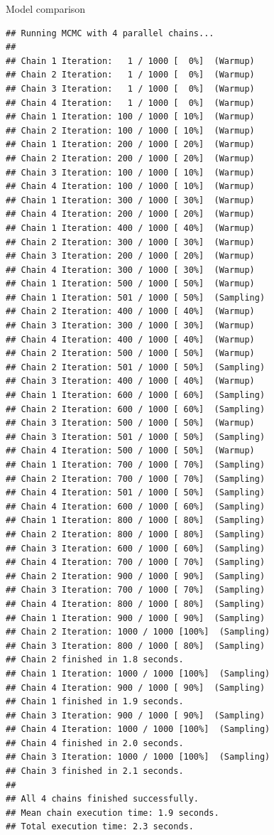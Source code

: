 \documentclass[
  ignorenonframetext,
]{beamer}
\begin{document}
\begin{frame}[fragile]{Model comparison}
\begin{verbatim}
## Running MCMC with 4 parallel chains...
## 
## Chain 1 Iteration:   1 / 1000 [  0%]  (Warmup) 
## Chain 2 Iteration:   1 / 1000 [  0%]  (Warmup) 
## Chain 3 Iteration:   1 / 1000 [  0%]  (Warmup) 
## Chain 4 Iteration:   1 / 1000 [  0%]  (Warmup) 
## Chain 1 Iteration: 100 / 1000 [ 10%]  (Warmup) 
## Chain 2 Iteration: 100 / 1000 [ 10%]  (Warmup) 
## Chain 1 Iteration: 200 / 1000 [ 20%]  (Warmup) 
## Chain 2 Iteration: 200 / 1000 [ 20%]  (Warmup) 
## Chain 3 Iteration: 100 / 1000 [ 10%]  (Warmup) 
## Chain 4 Iteration: 100 / 1000 [ 10%]  (Warmup) 
## Chain 1 Iteration: 300 / 1000 [ 30%]  (Warmup) 
## Chain 4 Iteration: 200 / 1000 [ 20%]  (Warmup) 
## Chain 1 Iteration: 400 / 1000 [ 40%]  (Warmup) 
## Chain 2 Iteration: 300 / 1000 [ 30%]  (Warmup) 
## Chain 3 Iteration: 200 / 1000 [ 20%]  (Warmup) 
## Chain 4 Iteration: 300 / 1000 [ 30%]  (Warmup) 
## Chain 1 Iteration: 500 / 1000 [ 50%]  (Warmup) 
## Chain 1 Iteration: 501 / 1000 [ 50%]  (Sampling) 
## Chain 2 Iteration: 400 / 1000 [ 40%]  (Warmup) 
## Chain 3 Iteration: 300 / 1000 [ 30%]  (Warmup) 
## Chain 4 Iteration: 400 / 1000 [ 40%]  (Warmup) 
## Chain 2 Iteration: 500 / 1000 [ 50%]  (Warmup) 
## Chain 2 Iteration: 501 / 1000 [ 50%]  (Sampling) 
## Chain 3 Iteration: 400 / 1000 [ 40%]  (Warmup) 
## Chain 1 Iteration: 600 / 1000 [ 60%]  (Sampling) 
## Chain 2 Iteration: 600 / 1000 [ 60%]  (Sampling) 
## Chain 3 Iteration: 500 / 1000 [ 50%]  (Warmup) 
## Chain 3 Iteration: 501 / 1000 [ 50%]  (Sampling) 
## Chain 4 Iteration: 500 / 1000 [ 50%]  (Warmup) 
## Chain 1 Iteration: 700 / 1000 [ 70%]  (Sampling) 
## Chain 2 Iteration: 700 / 1000 [ 70%]  (Sampling) 
## Chain 4 Iteration: 501 / 1000 [ 50%]  (Sampling) 
## Chain 4 Iteration: 600 / 1000 [ 60%]  (Sampling) 
## Chain 1 Iteration: 800 / 1000 [ 80%]  (Sampling) 
## Chain 2 Iteration: 800 / 1000 [ 80%]  (Sampling) 
## Chain 3 Iteration: 600 / 1000 [ 60%]  (Sampling) 
## Chain 4 Iteration: 700 / 1000 [ 70%]  (Sampling) 
## Chain 2 Iteration: 900 / 1000 [ 90%]  (Sampling) 
## Chain 3 Iteration: 700 / 1000 [ 70%]  (Sampling) 
## Chain 4 Iteration: 800 / 1000 [ 80%]  (Sampling) 
## Chain 1 Iteration: 900 / 1000 [ 90%]  (Sampling) 
## Chain 2 Iteration: 1000 / 1000 [100%]  (Sampling) 
## Chain 3 Iteration: 800 / 1000 [ 80%]  (Sampling) 
## Chain 2 finished in 1.8 seconds.
## Chain 1 Iteration: 1000 / 1000 [100%]  (Sampling) 
## Chain 4 Iteration: 900 / 1000 [ 90%]  (Sampling) 
## Chain 1 finished in 1.9 seconds.
## Chain 3 Iteration: 900 / 1000 [ 90%]  (Sampling) 
## Chain 4 Iteration: 1000 / 1000 [100%]  (Sampling) 
## Chain 4 finished in 2.0 seconds.
## Chain 3 Iteration: 1000 / 1000 [100%]  (Sampling) 
## Chain 3 finished in 2.1 seconds.
## 
## All 4 chains finished successfully.
## Mean chain execution time: 1.9 seconds.
## Total execution time: 2.3 seconds.
\end{verbatim}


\end{frame}
\end{document}
